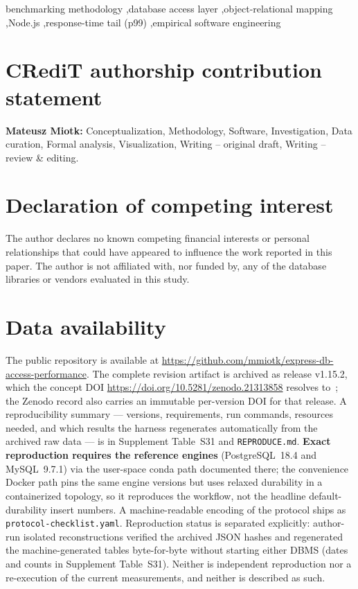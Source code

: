\documentclass[review]{elsarticle}
\begin{document}
\begin{frontmatter}
\begin{keyword}
benchmarking methodology \sep database access layer \sep object-relational mapping
\sep Node.js \sep response-time tail (p99) \sep empirical software engineering
\end{keyword}

\end{frontmatter}









\section*{CRediT authorship contribution statement}
\textbf{Mateusz Miotk:} Conceptualization, Methodology, Software, Investigation,
Data curation, Formal analysis, Visualization, Writing -- original draft,
Writing -- review \& editing.

\section*{Declaration of competing interest}
The author declares no known competing financial interests or personal
relationships that could have appeared to influence the work reported in this paper.
The author is not affiliated with, nor funded by, any of the database libraries or
vendors evaluated in this study.

\section*{Data availability}
The public repository is available at
\url{https://github.com/mmiotk/express-db-access-performance}. The complete revision artifact is
archived as release v1.15.2, which the concept DOI
\url{https://doi.org/10.5281/zenodo.21313858} resolves to~\cite{miotk2026artifact}; the Zenodo record
also carries an immutable per-version DOI for that release.
A reproducibility summary --- versions, requirements, run commands, resources needed, and which
results the harness regenerates automatically from the archived raw data --- is in Supplement
Table~S31 and \texttt{REPRODUCE.md}. \textbf{Exact reproduction requires the reference engines}
(PostgreSQL~18.4 and MySQL~9.7.1) via the user-space conda path documented there; the convenience
Docker path pins the same engine versions but uses relaxed durability in a containerized topology, so
it reproduces the workflow, not the headline default-durability insert numbers. A machine-readable
encoding of the protocol ships as \texttt{protocol-checklist.yaml}. Reproduction status is separated
explicitly: author-run isolated reconstructions verified the archived JSON hashes and regenerated the
machine-generated tables byte-for-byte without starting either DBMS (dates and counts in Supplement
Table~S31). Neither is independent reproduction nor a re-execution of the current measurements, and
neither is described as such.
\end{document}

